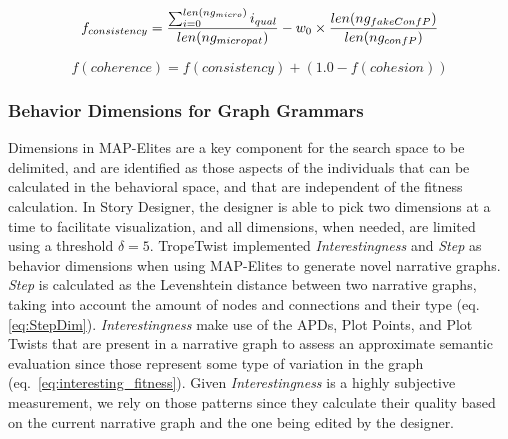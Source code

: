 





\begin{equation}
\label{eq:consistency_fitness}
f_{consistency} = \frac{\sum_{i=0}^{len(ng_{micro})} i_{qual}}{len(ng_{micropat})} -  \\ 
w_{0} \times \frac{len(ng_{fakeConfP})}{len(ng_{confP})} 
\end{equation}

\begin{equation}
\label{eq:coherence_fitness}
f(coherence) = f(consistency) + (1.0 - f(cohesion))
\end{equation}

\subsubsection{Behavior Dimensions for Graph Grammars}

Dimensions in MAP-Elites are a key component for the search space to be delimited, and are identified as those aspects of the individuals that can be calculated in the behavioral space, and that are independent of the fitness calculation. In Story Designer, the designer is able to pick two dimensions at a time to facilitate visualization, and all dimensions, when needed, are limited using a threshold $\delta = 5$. TropeTwist implemented \textit{Interestingness} and \textit{Step} as behavior dimensions when using MAP-Elites to generate novel narrative graphs. \textit{Step} is calculated as the Levenshtein distance between two narrative graphs, taking into account the amount of nodes and connections and their type (eq. \ref{eq:StepDim}). \textit{Interestingness} make use of the APDs, Plot Points, and Plot Twists that are present in a narrative graph to assess an approximate semantic evaluation since those represent some type of variation in the graph (eq.~\ref{eq:interesting_fitness}). Given \textit{Interestingness} is a highly subjective measurement, we rely on those patterns since they calculate their quality based on the current narrative graph and the one being edited by the designer.

